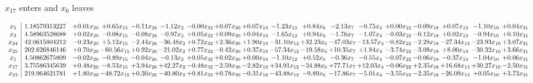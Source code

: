 \documentclass[9pt]{article}
\begin{document}
 $ x_{17} $ enters and $ x_{6} $ leaves 

 \[\begin{array}{c| c c@{\hskip 2pt} c@{\hskip 2pt} c@{\hskip 2pt} c@{\hskip 2pt} c@{\hskip 2pt} c@{\hskip 2pt} c@{\hskip 2pt} c@{\hskip 2pt} c@{\hskip 2pt} c@{\hskip 2pt} c@{\hskip 2pt} c@{\hskip 2pt} c@{\hskip 2pt} c@{\hskip 2pt} c@{\hskip 2pt} c@{\hskip 2pt} }
 x_{5}   &  1.18579313227 & +  0.01 x_{29} & +  0.65 x_{15} & -0.11 x_{26} & -1.12 x_{2} & -0.00 x_{32} & +  0.07 x_{30} & +  0.07 x_{19} & -1.23 x_{12} & +  0.84 x_{6} & -2.13 x_{7} & -0.75 x_{4} & +  0.00 x_{22} & -0.09 x_{18} & +  0.07 x_{13} & -1.10 x_{10} & +  0.04 x_{31}\\
 x_{3}   &  4.58963528688 & +  0.02 x_{29} & -0.08 x_{15} & -0.08 x_{26} & -0.97 x_{2} & +  0.05 x_{32} & +  0.09 x_{30} & +  0.04 x_{19} & -1.65 x_{12} & +  0.94 x_{6} & -1.76 x_{7} & -1.07 x_{4} & -0.03 x_{22} & -0.12 x_{18} & +  0.02 x_{13} & -0.94 x_{10} & +  0.10 x_{31}\\
 x_{24}   &  42.0615804212 & -0.23 x_{29} & +  5.12 x_{15} & -2.44 x_{26} & -36.48 x_{2} & +  0.72 x_{32} & +  2.36 x_{30} & +  1.90 x_{19} & -31.10 x_{12} & + 32.23 x_{6} & -47.03 x_{7} & -13.57 x_{4} & -0.82 x_{22} & -2.28 x_{18} & -27.34 x_{13} & -23.93 x_{10} & +  3.07 x_{31}\\
 x_{25}   &  202.626846146 & +  0.70 x_{29} & -60.56 x_{15} & +  0.92 x_{26} & -21.02 x_{2} & +  0.77 x_{32} & -0.42 x_{30} & +  0.37 x_{19} & -57.34 x_{12} & -19.58 x_{6} & + 10.35 x_{7} & +  1.84 x_{4} & -3.74 x_{22} & -3.08 x_{18} & +  8.00 x_{13} & -30.32 x_{10} & +  3.66 x_{31}\\
 x_{1}   &  4.50862675809 & -0.02 x_{29} & -0.89 x_{15} & -0.04 x_{26} & -0.13 x_{2} & +  0.05 x_{32} & +  0.02 x_{30} & +  0.00 x_{19} & -1.10 x_{12} & +  0.52 x_{6} & -0.36 x_{7} & -0.55 x_{4} & -0.07 x_{22} & -0.06 x_{18} & -0.37 x_{13} & -1.04 x_{10} & +  0.06 x_{31}\\
 x_{17}   &  3.75586345639 & +  0.48 x_{29} & -8.53 x_{15} & +  3.94 x_{26} & + 42.27 x_{2} & -0.48 x_{32} & -2.59 x_{30} & -2.82 x_{19} & + 34.91 x_{12} & -34.88 x_{6} & + 77.71 x_{7} & + 12.03 x_{4} & -0.06 x_{22} & +  2.35 x_{18} & + 16.68 x_{13} & + 30.27 x_{10} & -2.50 x_{31}\\
 x_{23}   &  219.964621781 & +  1.80 x_{29} & -48.72 x_{15} & +  0.30 x_{26} & -40.80 x_{2} & +  0.81 x_{32} & +  0.78 x_{30} & -0.31 x_{19} & -43.88 x_{12} & -9.89 x_{6} & -17.86 x_{7} & -5.01 x_{4} & -3.55 x_{22} & -2.35 x_{18} & -26.09 x_{13} & +  0.05 x_{10} & +  3.73 x_{31}\\

\end{array}\]
\end{document}
